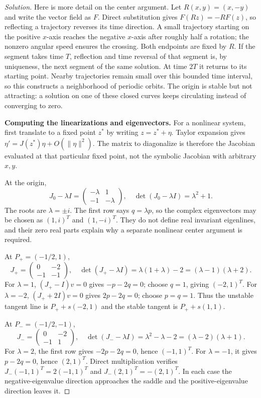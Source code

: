 \documentclass[10pt]{amsart}
\newenvironment{solution}
{\begin{proof}[Solution]}
{\end{proof}}
\begin{document}
\begin{enumerate}[label=\arabic*), leftmargin=*, itemsep=1em]
\begin{solution}
Here is more detail on the center argument. Let $R(x,y)=(x,-y)$ and write the vector field as $F$. Direct substitution gives $F(Rz)=-RF(z)$, so reflecting a trajectory reverses its time direction. A small trajectory starting on the positive $x$-axis reaches the negative $x$-axis after roughly half a rotation; the nonzero angular speed ensures the crossing. Both endpoints are fixed by $R$. If the segment takes time $T$, reflection and time reversal of that segment is, by uniqueness, the next segment of the same solution. At time $2T$ it returns to its starting point. Nearby trajectories remain small over this bounded time interval, so this constructs a neighborhood of periodic orbits. The origin is stable but not attracting: a solution on one of these closed curves keeps circulating instead of converging to zero.


\medskip\noindent\textbf{Computing the linearizations and eigenvectors.}
For a nonlinear system, first translate to a fixed point $z^*$ by writing $z=z^*+\eta$. Taylor expansion gives $\eta'=J(z^*)\eta+O(\|\eta\|^2)$. The matrix to diagonalize is therefore the Jacobian evaluated at that particular fixed point, not the symbolic Jacobian with arbitrary $x,y$.

At the origin,
\[
J_0-\lambda I=\begin{pmatrix}-\lambda&1\\-1&-\lambda\end{pmatrix},
\quad\det(J_0-\lambda I)=\lambda^2+1.
\]
The roots are $\lambda=\pm i$. The first row says $q=\lambda p$, so the complex eigenvectors may be chosen as $(1,i)^T$ and $(1,-i)^T$. They do not define real invariant eigenlines, and their zero real parts explain why a separate nonlinear center argument is required.

At $P_+=(-1/2,1)$,
\[
J_+=\begin{pmatrix}0&-2\\-1&-1\end{pmatrix},\quad
\det(J_+-\lambda I)=\lambda(1+\lambda)-2=(\lambda-1)(\lambda+2).
\]
For $\lambda=1$, $(J_+-I)v=0$ gives $-p-2q=0$; choose $q=1$, giving $(-2,1)^T$. For $\lambda=-2$, $(J_++2I)v=0$ gives $2p-2q=0$; choose $p=q=1$. Thus the unstable tangent line is $P_++s(-2,1)$ and the stable tangent is $P_++s(1,1)$.

At $P_-=(-1/2,-1)$,
\[
J_-=\begin{pmatrix}0&-2\\-1&1\end{pmatrix},\quad
\det(J_--\lambda I)=\lambda^2-\lambda-2=(\lambda-2)(\lambda+1).
\]
For $\lambda=2$, the first row gives $-2p-2q=0$, hence $(-1,1)^T$. For $\lambda=-1$, it gives $p-2q=0$, hence $(2,1)^T$. Direct multiplication verifies $J_-(-1,1)^T=2(-1,1)^T$ and $J_-(2,1)^T=-(2,1)^T$. In each case the negative-eigenvalue direction approaches the saddle and the positive-eigenvalue direction leaves it.


\end{solution}
\end{enumerate}
\end{document}
